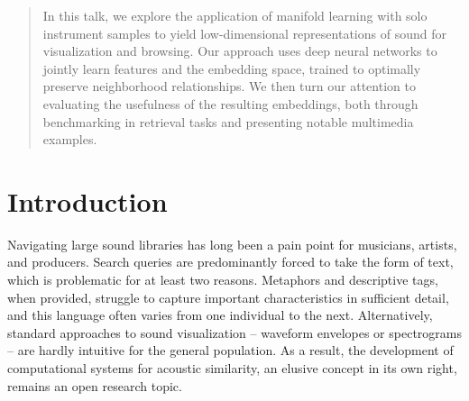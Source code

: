 \documentclass{article}
\begin{document}

\begin{abstract}

In this talk, we explore the application of manifold learning with solo instrument samples to yield low-dimensional representations of sound for visualization and browsing.
Our approach uses deep neural networks to jointly learn features and the embedding space, trained to optimally preserve neighborhood relationships.
We then turn our attention to evaluating the usefulness of the resulting embeddings, both through benchmarking in retrieval tasks and presenting notable multimedia examples.


\end{abstract}

\section{Introduction}
\label{submission}


Navigating large sound libraries has long been a pain point for musicians, artists, and producers.
Search queries are predominantly forced to take the form of text, which is problematic for at least two reasons.
Metaphors and descriptive tags, when provided, struggle to capture important characteristics in sufficient detail, and this language often varies from one individual to the next.
Alternatively, standard approaches to sound visualization -- waveform envelopes or spectrograms -- are hardly intuitive for the general population.
As a result, the development of computational systems for acoustic similarity, an elusive concept in its own right, remains an open research topic.
\end{document}
